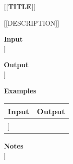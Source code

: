 \documentclass{article}%
\begin{document}
%
\begin{center}%
{\LARGE{\textbf{[[TITLE]]}}}%
\end{center}%

[[DESCRIPTION]]

\textbf{Input}\\%
[[INPUT]]%

\textbf{Output}\\%
[[OUTPUT]]%

\textbf{Examples}\\%
\noindent%
\begin{tabular}[t]{|p{}|p{}|}%
\hline%
\textbf{Input} & \textbf{Output} \\\hline%
[[VERBATIM_EXAMPLE_ROWS]]%
\end{tabular}%

\textbf{Notes}\\%
[[NOTES]]%
\end{document}
